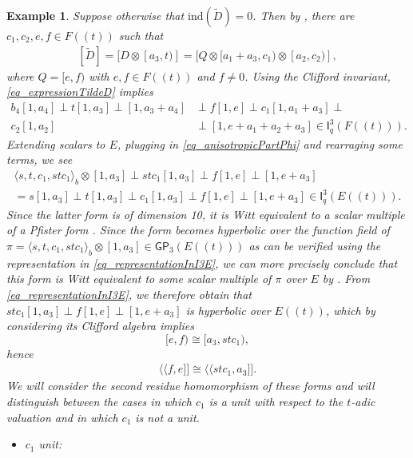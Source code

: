 \documentclass{amsart}
\newtheorem{example}[definition]{Example}
\numberwithin{equation}{section}
\newcommand{\qpf}[1]{\langle\!\langle #1]\!]}
\newcommand{\bif}[1]{\langle #1 \rangle_b}
\newcommand{\dbrac}[1]{(\!(#1)\!)}
\newcommand{\ind}{\mathrm{ind}}
\newcommand{\quat}[1]{[#1)}
\newcommand{\I}{\mathsf{I}}
\newcommand{\GP}{\mathsf{GP}}
\begin{document}
\begin{example}
    Suppose otherwise that $\ind(\tilde D) = 0$.
    Then by , there are $c_1, c_2, e, f \in F\dbrac t$ such that
    \begin{align} \label{eq_expressionTildeD}
        [\tilde D] = [D \otimes \quat{a_3, t}] = [Q \otimes \quat{a_1 + a_3, c_1} \otimes \quat{a_2, c_2}],
    \end{align}
    where $Q = \quat{e, f}$ with $e, f \in F\dbrac t$ and $f \neq 0$.
    Using the Clifford invariant, \eqref{eq_expressionTildeD} implies
    \begin{align*}
    	b_4[1, a_4] \perp t[1, a_3] \perp [1, a_3 + a_4] &\perp f[1, e] \perp c_1[1, a_1 + a_3] \perp \\
	c_2[1, a_2] &\perp [1, e + a_1 + a_2 + a_3] \in \I_q^3(F\dbrac{t}).
    \end{align*}
    Extending scalars to $E$, plugging in \eqref{eq_anisotropicPartPhi} and rearraging some terms, we see
    \begin{align} \label{eq_representationInI3E}
        \bif{s, t, c_1, stc_1} \otimes [1, a_3] \perp stc_1[1, a_3] \perp f[1, e] \perp [1, e + a_3] \\
        = s[1, a_3] \perp t[1, a_3] \perp c_1[1, a_3] \perp f[1, e] \perp [1, e + a_3] \in \I_q^3(E\dbrac{t}).\nonumber
    \end{align}
    Since the latter form is of dimension 10, it is Witt equivalent to a scalar multiple of a Pfister form \cite[Proposition 82.1]{ElmanKarpenkoMerkurjev2008}.
    Since the form becomes hyperbolic over the function field of $\pi = \bif{s, t, c_1, stc_1} \otimes [1, a_3] \in \GP_3(E\dbrac{t})$ as can be verified using the representation in \eqref{eq_representationInI3E}, we can more precisely conclude that this form is Witt equivalent to some scalar multiple of $\pi$ over $E$ by \cite[Corollary 23.6]{ElmanKarpenkoMerkurjev2008}.
    From \eqref{eq_representationInI3E}, we therefore obtain that $stc_1[1, a_3] \perp f[1, e] \perp [1, e + a_3]$ is hyperbolic over $E\dbrac t$, which by considering its Clifford algebra implies
    \[\quat{e, f} \cong \quat{a_3, stc_1},\]
    hence
    \begin{align*}
    	\qpf{f, e} \cong \qpf{stc_1, a_3}.
	\end{align*}
    We will consider the second residue homomorphism of these forms and will distinguish between the cases in which $c_1$ is a unit with respect to the $t$-adic valuation and in which $c_1$ is not a unit.
    \begin{itemize}
        \item $c_1$ unit:

\end{itemize}
\end{example}
\end{document}
